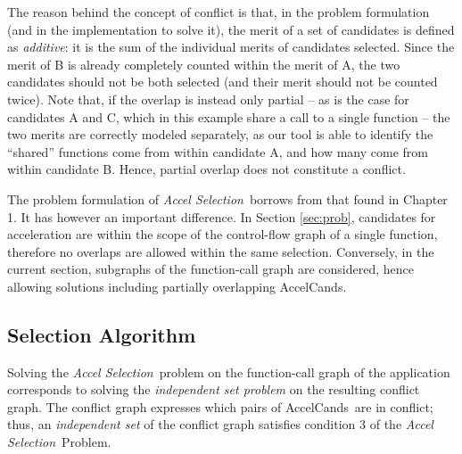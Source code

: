 \documentclass[]{usiinfthesis}
\newcommand{\candidates}{{AccelCand}s}
\newcommand{\asprobname}{\emph{Accel Selection}}
\begin{document}
The reason behind the concept of conflict is that, in the problem
formulation (and in the implementation to solve it), the merit of a set
of candidates is defined as \emph{additive}: it is the sum of the
individual merits of candidates selected. Since the merit of B is
already completely counted within the merit of A, the two candidates
should not be both selected (and their merit should not be counted
twice).
Note that, if the overlap is instead only partial -- as is the case for 
candidates A and C, which in this example share a call to a single function 
-- the two merits are correctly modeled separately, as our tool is able to identify
the ``shared'' functions come from within candidate A, 
and how many come from within candidate B. Hence, partial overlap does not constitute 
a conflict.\par

The problem formulation of \asprobname\
borrows from that found in Chapter 1. It has however
an important difference. In Section \ref{sec:prob}, candidates for acceleration %
are within the scope of the control-flow graph of a single function, therefore 
no overlaps are allowed within the same selection. Conversely, in the current section, 
subgraphs of the function-call graph are considered, hence allowing solutions including 
partially overlapping \candidates.


\subsection{Selection Algorithm}
\label{sec:algo}

Solving the \asprobname\ problem on the function-call graph of the
application corresponds to solving the \emph{independent set problem} on 
the resulting conflict graph. The conflict graph expresses which pairs of 
\candidates\ are in conflict; thus, an \emph{independent set} of the conflict 
graph satisfies condition $3$ of the \asprobname\ Problem.\par
\end{document}
